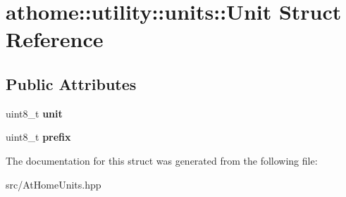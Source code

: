 \hypertarget{structathome_1_1utility_1_1units_1_1_unit}{}\section{athome\+:\+:utility\+:\+:units\+:\+:Unit Struct Reference}
\label{structathome_1_1utility_1_1units_1_1_unit}
\subsection*{Public Attributes}
\begin{DoxyCompactItemize}
\item 
\mbox{\label{structathome_1_1utility_1_1units_1_1_unit_ad627fbae275f81a1632daf0d80769b1c}} 
uint8\+\_\+t {\bfseries unit}
\item 
\mbox{\label{structathome_1_1utility_1_1units_1_1_unit_a8c99ee8bca4e320323ccbb358eddb284}} 
uint8\+\_\+t {\bfseries prefix}
\end{DoxyCompactItemize}


The documentation for this struct was generated from the following file\+:\begin{DoxyCompactItemize}
\item 
src/At\+Home\+Units.\+hpp\end{DoxyCompactItemize}
